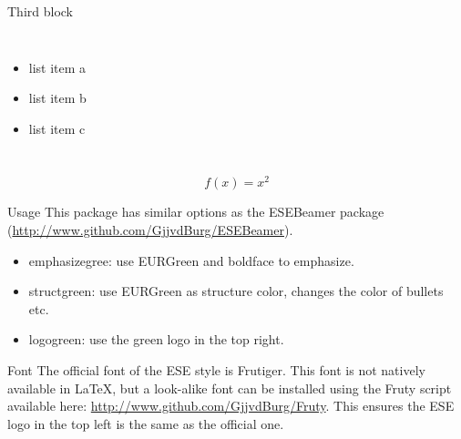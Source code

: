 \documentclass{beamer}
\begin{document}
\begin{frame}
\begin{columns}[t]
\begin{column}{.3\paperwidth}
\begin{block}{Third block}
\begin{columns}
				\begin{itemize}
					\item list item a
					\item list item b
					\item list item c
				\end{itemize}
			\end{columns}
			\baselineskip
			\begin{equation*}
				f(x) = x^2
			\end{equation*}
		\end{block}
		\vfill
		\begin{block}{Usage}
			This package has similar options as the ESEBeamer package (\url{http://www.github.com/GjjvdBurg/ESEBeamer}).
			\begin{itemize}
				\item emphasizegree: use {\color{EURGreen} EURGreen} and boldface to emphasize.
				\item structgreen: use {\color{EURGreen} EURGreen} as structure color, changes the color of bullets etc.
				\item logogreen: use the green logo in the top right.
			\end{itemize}
		\end{block}
		\vfill
		\begin{block}{Font}
			The official font of the ESE style is Frutiger. This font is not natively available in \LaTeX, but a look-alike font can be installed using the Fruty script available here: \url{http://www.github.com/GjjvdBurg/Fruty}. This ensures the ESE logo in the top left is the same as the official one.
		\end{block}
    \end{column}
	

\end{columns}
\end{frame}
\end{document}
